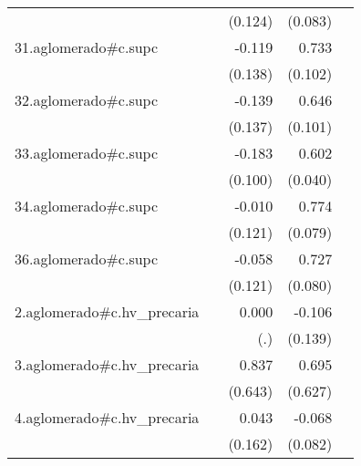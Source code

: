{\begin{longtable}{l*{4}{D{.}{.}{-1}}}
            &                     &     (0.124)         &     (0.083)         &                     \\
\addlinespace
31.aglomerado#c.supc&                     &      -0.119         &       0.733\sym{***}&                     \\
            &                     &     (0.138)         &     (0.102)         &                     \\
\addlinespace
32.aglomerado#c.supc&                     &      -0.139         &       0.646\sym{***}&                     \\
            &                     &     (0.137)         &     (0.101)         &                     \\
\addlinespace
33.aglomerado#c.supc&                     &      -0.183         &       0.602\sym{***}&                     \\
            &                     &     (0.100)         &     (0.040)         &                     \\
\addlinespace
34.aglomerado#c.supc&                     &      -0.010         &       0.774\sym{***}&                     \\
            &                     &     (0.121)         &     (0.079)         &                     \\
\addlinespace
36.aglomerado#c.supc&                     &      -0.058         &       0.727\sym{***}&                     \\
            &                     &     (0.121)         &     (0.080)         &                     \\
\addlinespace
2.aglomerado#c.hv\_precaria&                     &       0.000         &      -0.106         &                     \\
            &                     &         (.)         &     (0.139)         &                     \\
\addlinespace
3.aglomerado#c.hv\_precaria&                     &       0.837         &       0.695         &                     \\
            &                     &     (0.643)         &     (0.627)         &                     \\
\addlinespace
4.aglomerado#c.hv\_precaria&                     &       0.043         &      -0.068         &                     \\
            &                     &     (0.162)         &     (0.082)         &                     \\

\end{longtable}}
